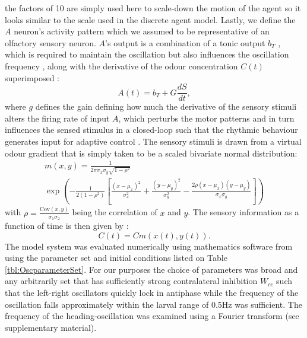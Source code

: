 \documentclass[11pt,a4paper]{article}
\newcommand{\Cov}{\mathrm{Cov}}
\newcommand{\todoKL}[1]{\todo[author=KL,color=blue!40, size=\tiny,inline]{#1}}
\begin{document}
 the factors of 10 are simply used here to scale-down the motion of the agent so it looks similar to the scale used in the discrete agent model.
Lastly, we define the $A$ neuron's activity pattern which we assumed to be representative of an olfactory sensory neuron. $A$'s output is a combination of a tonic output $b_T$ , which is required to maintain the oscillation but also influences the oscillation frequency \cite{lansner1997realistic}, along with the derivative of the odour concentration $C(t)$ superimposed : 
\begin{equation}
A(t) = b_T + G \frac{dS}{dt},
\end{equation}
where $g$ defines the gain defining how much the derivative of the sensory stimuli alters the firing  rate of input $A$, which perturbs the motor patterns and in turn influences the sensed stimulus in a closed-loop such that the rhythmic behaviour generates input for adaptive control \cite[see][]{willis1997centrally}.
The sensory stimuli is drawn from a virtual odour gradient that is simply taken to be a scaled bivariate normal distribution:
\begin{multline}
m(x,y) = \frac{1}{2 \pi  \sigma_x \sigma_y \sqrt{1-\rho^2}}\\
      \exp\left(
        -\frac{1}{2(1-\rho^2)}
        \left[
          \frac{(x-\mu_x)^2}{\sigma_x^2} + 
          \frac{(y-\mu_y)^2}{\sigma_y^2} -
          \frac{2\rho(x-\mu_x)(y-\mu_y)}{\sigma_x \sigma_y} \right]\right)
\label{eqn:bivariateNormal}
\end{multline}
with $\rho = \frac{\Cov(x,y)}{\sigma_1 \sigma_2}$ being the correlation of $x$ and $y$.
The sensory information as a function of time is then given by :
\begin{equation}
C(t) = C m(x(t),y(t)).
\label{eq:SensoryFunction}
\end{equation}
The model system was evaluated numerically using mathematics software from \cite{math}
using the parameter set and initial conditions listed on Table \ref{tbl:OscparameterSet}.
 For our purposes the choice of parameters was broad and any arbitrarily set that has sufficiently strong contralateral inhibition $W_{cc}$ such that the left-right oscillators quickly lock in antiphase while the frequency of the oscillation falls approximately within the larval range of 0.5Hz was sufficient. The frequency of the heading-oscillation was examined using a Fourier transform (see supplementary material).
\end{document}
